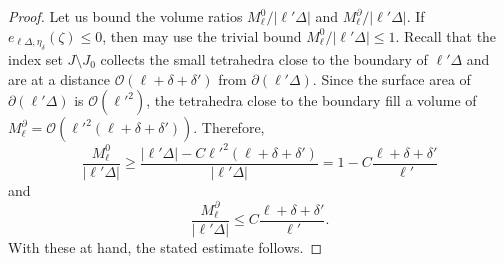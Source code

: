 \documentclass[final,onefignum,onetabnum,reqno]{amsart}
\theoremstyle{remark}
\renewcommand{\le}{\leqslant}
\renewcommand{\ge}{\geqslant}
\newcommand{\tetra}{\mathbb{\Delta}} %
\newcommand{\OC}{\mathcal{O}}
\begin{document}
\begin{proof}
Let us bound the volume ratios $M_\ell^0/|\ell'\tetra|$ and $M_\ell^\partial/|\ell'\tetra|$. If $e_{\ell\tetra,\eta_\delta}(\zeta)\le 0$, then may use the trivial bound $M_\ell^0/|\ell'\tetra|\le 1$. Recall that the index set $J\setminus J_0$ collects the small tetrahedra close to the boundary of $\ell'\tetra$ and are at a distance $\OC(\ell+\delta+\delta')$ from $\partial(\ell'\tetra)$. Since the surface area of $\partial(\ell'\tetra)$ is $\OC(\ell'^2)$, the tetrahedra close to the boundary fill a volume of $M_\ell^\partial=\OC(\ell'^2(\ell+\delta+\delta'))$. Therefore,
\begin{equation}\label{volbubound}
\frac{M_\ell^0}{|\ell'\tetra|}\ge \frac{|\ell'\tetra|-C\ell'^2(\ell+\delta+\delta')}{|\ell'\tetra|}=1-C\frac{\ell+\delta+\delta'}{\ell'}
\end{equation}
and 
\begin{equation}\label{volbdbound}
\frac{M_\ell^\partial}{|\ell'\tetra|}\le C \frac{\ell+\delta+\delta'}{\ell'}.
\end{equation}
With these at hand, the stated estimate follows.
\end{proof}
\end{document}
